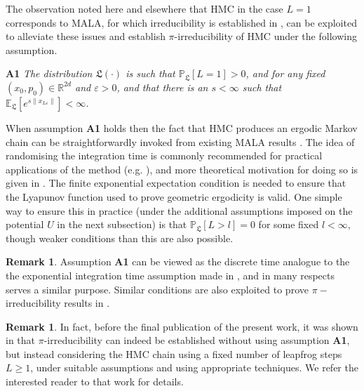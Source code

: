\documentclass[bj,numbers,noshowframe]{imsart}
\newcommand{\X}{\mathbf{X}}
\newcommand{\R}{\mathbb{R}}
\newcommand{\e}{\varepsilon}
\theoremstyle{definition}
\theoremstyle{plain}
\theoremstyle{definition}
\newtheorem{rem}[defn]{Remark}
\begin{document}

The observation noted here and elsewhere that HMC in the case $L=1$ corresponds to MALA, for which irreducibility is established in \citep{roberts1996exponential}, can be exploited to alleviate these issues and establish $\pi$-irreducibility of HMC under the following assumption.

\vspace{0.35cm}

\noindent \textbf{A1} {\itshape The distribution $\mathfrak{L}(\cdot)$ is such that $\mathbb{P}_{\mathfrak{L}}[L=1]>0$, and for any fixed $(x_0,p_0)\in \R^{2d}$ and $\e>0$, and that there is an $s <\infty$ such that $\mathbb{E}_\mathfrak{L} [e^{s\|x_{L\e}\|}]<\infty$.} \label{ass:A1}

\vspace{0.35cm}

When assumption \textbf{A1} holds then the fact that HMC produces an ergodic Markov chain can be straightforwardly invoked from existing MALA results \citep{roberts1996exponential}.  The idea of randomising the integration time is commonly recommended for practical applications of the method (e.g. \citep{neal2011mcmc,girolami2011riemann}), and more theoretical motivation for doing so is given in \citep{betancourt2016identifying}.  The finite exponential expectation condition is needed to ensure that the Lyapunov function used to prove geometric ergodicity is valid.  One simple way to ensure this in practice (under the additional assumptions imposed on the potential $U$ in the next subsection) is that $\mathbb{P}_{\mathfrak{L}}[L>l]=0$ for some fixed $l<\infty$, though weaker conditions than this are also possible.

\begin{rem} 
Assumption \textbf{A1} can be viewed as the discrete time analogue to the the exponential integration time assumption made in \citep{bou2015randomized}, and in many respects serves a similar purpose.  Similar conditions are also exploited to prove $\pi-$irreducibility results in \citep{cances2007theoretical}.
\end{rem}

\begin{rem}
In fact, before the final publication of the present work, it was shown in \citep{durmus2017convergence} that $\pi$-irreducibility can indeed be established without using assumption \textbf{A1}, but instead considering the HMC chain using a fixed number of leapfrog steps $L\geq 1$, under suitable assumptions and using appropriate techniques. We refer the interested reader to that work for details.
\end{rem}
\end{document}

